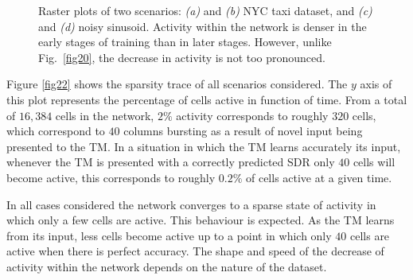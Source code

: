 \documentclass[11pt,letterpaper]{article}
\begin{document}
\begin{figure}[t]
{				    \label{fig21:c}
			    }
			    \caption{
			        Raster plots of two scenarios: \emph{(a)} and \emph{(b)} NYC taxi dataset, 
			        and \emph{(c)} and \emph{(d)} noisy sinusoid.
			        Activity within the network is denser in the early stages of training than
			        in later stages. However, unlike Fig.~\ref{fig20}, the decrease in activity
			        is not too pronounced.
			    }
			    \label{fig21}
		    \end{figure}
		    
		    Figure \ref{fig22} shows the sparsity trace of all scenarios considered.
		    The $y$ axis of this plot represents the percentage of cells active in function
		    of time. From a total of $16,384$ cells in the network, $2\%$ activity corresponds
		    to roughly $320$ cells, which correspond to $40$ columns bursting as a result of
		    novel input being presented to the TM.
		    In a situation in which the TM learns accurately its input, whenever the TM is
		    presented with a correctly predicted SDR only $40$ cells will become active,
		    this corresponds to roughly $0.2\%$ of cells active at a given time.
		    
		    In all cases considered the network converges to a sparse state of activity in
		    which only a few cells are active.
		    This behaviour is expected. As the TM learns from its input, less cells become
		    active up to a point in which only $40$ cells are active when there is perfect accuracy.
		    The shape and speed of the decrease of activity within the network depends on the
		    nature of the dataset.
\end{document}
